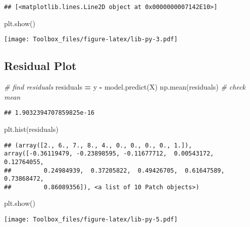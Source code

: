 \documentclass[
]{book}
\newenvironment{Shaded}{\begin{snugshade}}{\end{snugshade}}
\newcommand{\CommentTok}[1]{\textcolor[rgb]{0.56,0.35,0.01}{\textit{#1}}}
\newcommand{\NormalTok}[1]{#1}
\newcommand{\OperatorTok}[1]{\textcolor[rgb]{0.81,0.36,0.00}{\textbf{#1}}}
\begin{document}
\begin{verbatim}
## [<matplotlib.lines.Line2D object at 0x0000000007142E10>]
\end{verbatim}

\begin{Shaded}
\begin{Highlighting}[]
\NormalTok{plt.show()}
\end{Highlighting}
\end{Shaded}

\texttt{[image: Toolbox\_files/figure-latex/lib-py-3.pdf]}

\hypertarget{residual-plot}{%
\subsection{Residual Plot}\label{residual-plot}}

\begin{Shaded}
\begin{Highlighting}[]
\CommentTok{\# find residuals}
\NormalTok{residuals }\OperatorTok{=}\NormalTok{ y }\OperatorTok{{-}}\NormalTok{ model.predict(X)}
\NormalTok{np.mean(residuals) }\CommentTok{\# check mean}
\end{Highlighting}
\end{Shaded}

\begin{verbatim}
## 1.9032394707859825e-16
\end{verbatim}

\begin{Shaded}
\begin{Highlighting}[]
\NormalTok{plt.hist(residuals)}
\end{Highlighting}
\end{Shaded}

\begin{verbatim}
## (array([2., 6., 7., 8., 4., 0., 0., 0., 0., 1.]), array([-0.36119479, -0.23898595, -0.11677712,  0.00543172,  0.12764055,
##         0.24984939,  0.37205822,  0.49426705,  0.61647589,  0.73868472,
##         0.86089356]), <a list of 10 Patch objects>)
\end{verbatim}

\begin{Shaded}
\begin{Highlighting}[]
\NormalTok{plt.show()}
\end{Highlighting}
\end{Shaded}

\texttt{[image: Toolbox\_files/figure-latex/lib-py-5.pdf]}
\end{document}
